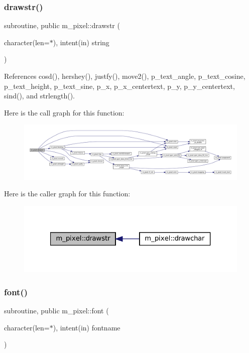 \subsubsection{\texorpdfstring{drawstr()}{drawstr()}}
{\footnotesize\ttfamily subroutine, public m\+\_\+pixel\+::drawstr (\begin{DoxyParamCaption}\item[{character(len=$\ast$), intent(in)}]{string }\end{DoxyParamCaption})}



References cosd(), hershey(), justfy(), move2(), p\+\_\+text\+\_\+angle, p\+\_\+text\+\_\+cosine, p\+\_\+text\+\_\+height, p\+\_\+text\+\_\+sine, p\+\_\+x, p\+\_\+x\+\_\+centertext, p\+\_\+y, p\+\_\+y\+\_\+centertext, sind(), and strlength().

Here is the call graph for this function\+:
\nopagebreak
\begin{figure}[H]
\begin{center}
\leavevmode
\includegraphics[width=350pt]{namespacem__pixel_a6fa0c2d531d1ac74840aa2f0e2b050e0_cgraph}
\end{center}
\end{figure}
Here is the caller graph for this function\+:
\nopagebreak
\begin{figure}[H]
\begin{center}
\leavevmode
\includegraphics[width=321pt]{namespacem__pixel_a6fa0c2d531d1ac74840aa2f0e2b050e0_icgraph}
\end{center}
\end{figure}
\mbox{\label{namespacem__pixel_a566adb827a3a26ba42d4e86e4c6e12af}} 
\subsubsection{\texorpdfstring{font()}{font()}}
{\footnotesize\ttfamily subroutine, public m\+\_\+pixel\+::font (\begin{DoxyParamCaption}\item[{character(len=$\ast$), intent(in)}]{fontname }\end{DoxyParamCaption})}



